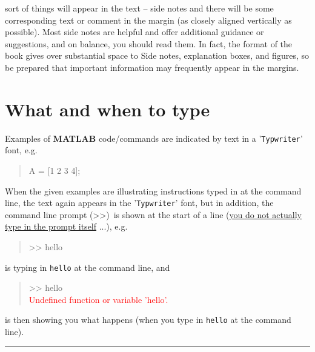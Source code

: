 \documentclass{tufte-book} %
\newenvironment{docspec}{\begin{quotation}\ttfamily\parskip0pt\parindent0pt\ignorespaces}{\end{quotation}}
\begin{document}
 sort of things will appear in the text -- side notes and there will be some corresponding text or comment in the margin (as closely aligned vertically as possible). Most side notes are helpful and offer additional guidance or suggestions, and on balance, you should read them. In fact, the format of the book gives over substantial space to Side notes, explanation boxes, and figures, so be prepared that important information may frequently appear in the margins.


\section{What and when to type}

Examples of \textbf{MATLAB} code/commands are indicated by text in a '\texttt{Typwriter}' font, e.g.

\begin{docspec}
A = [1 2 3 4];
\end{docspec}  

\noindent When the given examples are illustrating instructions typed in at the command line, the text  again appears in the '\texttt{Typwriter}' font, but in addition, the command line prompt (\textgreater\textgreater)\ is shown at the start of a line (\uline{you do not actually type in the prompt itself} ...), e.g.

\begin{docspec}
>> hello
\end{docspec}  

is typing in \texttt{hello} at the command line, and

\begin{docspec}
>> hello\\
\textcolor{red}{Undefined function or variable 'hello'.}\\
\end{docspec}  

is then showing you what happens (when you type in \texttt{hello} at the command line).

\vspace{1mm}
\noindent\rule{4cm}{0.5pt}
\vspace{2mm}
\end{document}
